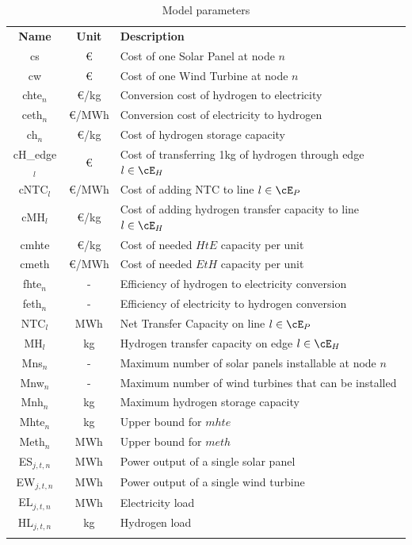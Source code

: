 \begin{table}
\caption{Model parameters}
  \label{table_param}
\begin{tabularx}{\textwidth}{ccl}
  \hline\noalign{\smallskip}
    \textbf{Name} & \textbf{Unit} & \textbf{Description}\\
  \noalign{\smallskip}\hline\noalign{\smallskip}
    cs & \euro& Cost of one Solar Panel at node $n$\\
    cw & \euro & Cost of one Wind Turbine at node $n$\\
    chte$_n$ & \euro/kg & Conversion cost of hydrogen to electricity \\
    ceth$_n$ & \euro/MWh & Conversion cost of electricity to hydrogen \\
    ch$_n$ & \euro/kg & Cost of hydrogen storage capacity\\
    cH\_edge$_l$ & \euro & Cost of transferring 1kg of hydrogen through edge $l\in\cE_H$\\
    cNTC$_l$ & \euro/MWh & Cost of adding NTC to line $l\in\cE_P$\\
    cMH$_l$ &\euro/kg& Cost of adding hydrogen transfer capacity to line $l\in\cE_H$\\
    cmhte & \euro/kg & Cost of needed $HtE$ capacity per unit\\
    cmeth & \euro/MWh&Cost of needed $EtH$ capacity per unit\\
  \noalign{\smallskip}\hline\noalign{\smallskip}
    fhte$_n$ & - & Efficiency of hydrogen to electricity conversion \\ 
    feth$_n$ & - & Efficiency of electricity to hydrogen conversion \\
    NTC$_l$ & MWh & Net Transfer Capacity on line $l\in\cE_P$\\
    MH$_l$ & kg &  Hydrogen transfer capacity on edge $l\in\cE_H$\\
  \noalign{\smallskip}\hline\noalign{\smallskip}
    Mns$_n$ & - & Maximum number of solar panels installable at node $n$\\ 
    Mnw$_n$ & - & Maximum number of wind turbines that can be installed \\ 
    Mnh$_n$ & kg & Maximum hydrogen storage capacity \\
    Mhte$_n$ & kg & Upper bound for \(mhte\) \\ 
    Meth$_n$ & MWh & Upper bound for \(meth\) \\
  \noalign{\smallskip}\hline\noalign{\smallskip}
    ES$_{j,t,n}$ & MWh & Power output of a single solar panel\\
    EW$_{j,t,n}$ & MWh & Power output of a single wind turbine \\
    EL$_{j,t,n}$ & MWh & Electricity load \\
    HL$_{j,t,n}$ & kg & Hydrogen load\\
    \noalign{\smallskip}\hline
\end{tabularx}
\end{table}



